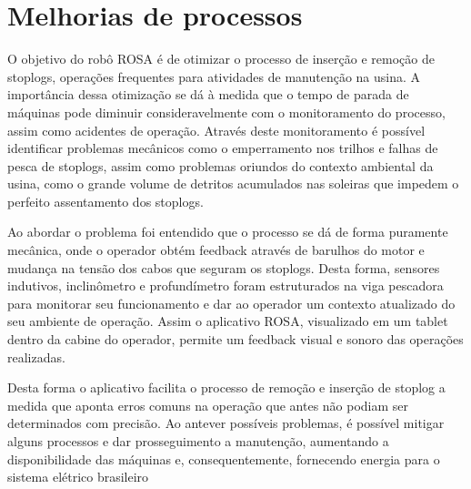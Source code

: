 \section{Melhorias de processos}
O objetivo do robô ROSA é de otimizar o processo de inserção e remoção de
stoplogs, operações frequentes para atividades de manutenção na usina. A
importância dessa otimização se dá à medida que o tempo de parada de máquinas
pode diminuir consideravelmente com o monitoramento do processo, assim como
acidentes de operação. Através deste monitoramento é possível identificar
problemas mecânicos como o emperramento nos trilhos e falhas de pesca de
stoplogs, assim como problemas oriundos do contexto ambiental da usina, como o
grande volume de detritos acumulados nas soleiras que impedem o perfeito
assentamento dos stoplogs.

Ao abordar o problema foi entendido que o processo se dá de forma puramente
mecânica, onde o operador obtém feedback através de barulhos do motor e mudança
na tensão dos cabos que seguram os stoplogs. Desta forma, sensores indutivos,
inclinômetro e profundímetro foram estruturados na viga pescadora para monitorar
seu funcionamento e dar ao operador um contexto atualizado do seu ambiente de
operação. Assim o aplicativo ROSA, visualizado em um tablet dentro da cabine do
operador, permite um feedback visual e sonoro das operações realizadas.

Desta forma o aplicativo facilita o processo de remoção e inserção de stoplog a
medida que aponta erros comuns na operação que antes não podiam ser determinados com
precisão. Ao antever possíveis problemas, é possível mitigar alguns processos e
dar prosseguimento a manutenção, aumentando a disponibilidade das máquinas e,
consequentemente, fornecendo energia para o sistema elétrico brasileiro

